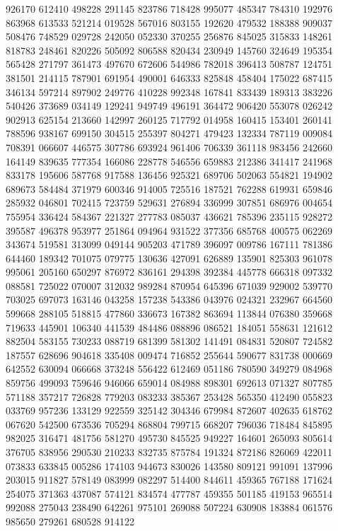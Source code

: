 {926170 612410 498228 291145 823786 718428 995077 485347 784310 192976 863968%
613533 521214 019528 567016 803155 192620 479532 188388 909037 508476 748529%
029728 242050 052330 370255 256876 845025 315833 148261 818783 248461 820226%
505092 806588 820434 230949 145760 324649 195354 565428 271797 361473 497670%
672606 544986 782018 396413 508787 124751 381501 214115 787901 691954 490001%
646333 825848 458404 175022 687415 346134 597214 897902 249776 410228 992348%
167841 833439 189313 383226 540426 373689 034149 129241 949749 496191 364472%
906420 553078 026242 902913 625154 213660 142997 260125 717792 014958 160415%
153401 260141 788596 938167 699150 304515 255397 804271 479423 132334 787119%
009084 708391 066607 446575 307786 693924 961406 706339 361118 983456 242660%
164149 839635 777354 166086 228778 546556 659883 212386 341417 241968 833178%
195606 587768 917588 136456 925321 689706 502063 554821 194902 689673 584484%
371979 600346 914005 725516 187521 762288 619931 659846 285932 046801 702415%
723759 529631 276894 336999 307851 686976 004654 755954 336424 584367 221327%
277783 085037 436621 785396 235115 928272 395587 496378 953977 251864 094964%
931522 377356 685768 400575 062269 343674 519581 313099 049144 905203 471789%
396097 009786 167111 781386 644460 189342 701075 079775 130636 427091 626889%
135901 825303 961078 995061 205160 650297 876972 836161 294398 392384 445778%
666318 097332 088581 725022 070007 312032 989284 870954 645396 671039 929002%
539770 703025 697073 163146 043258 157238 543386 043976 024321 232967 664560%
599668 288105 518815 477860 336673 167382 863694 113844 076380 359668 719633%
445901 106340 441539 484486 088896 086521 184051 558631 121612 882504 583155%
730233 088719 681399 581302 141491 084831 520807 724582 187557 628696 904618%
335408 009474 716852 255644 590677 831738 000669 642552 630094 066668 373248%
556422 612469 051186 780590 349279 084968 859756 499093 759646 946066 659014%
084988 898301 692613 071327 807785 571188 357217 726828 779203 083233 385367%
253428 565350 412490 055823 033769 957236 133129 922559 325142 304346 679984%
872607 402635 618762 067620 542500 673536 705294 868804 799715 668207 796036%
718484 845895 982025 316471 481756 581270 495730 845525 949227 164601 265093%
805614 376705 838956 290530 210233 832735 875784 191324 872186 826069 422011%
073833 633845 005286 174103 944673 830026 143580 809121 991091 137996 203015%
911827 578149 083999 082297 514400 844611 459365 767188 171624 254075 371363%
437087 574121 834574 477787 459355 501185 419153 965514 992088 275043 238490%
642261 975101 269088 507224 630908 183884 061576 985650 279261 680528 914122%
}
